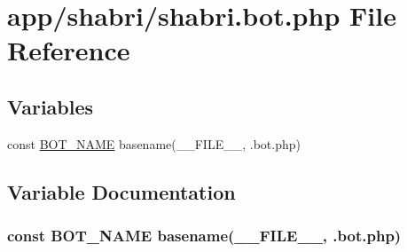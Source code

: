 \hypertarget{shabri_8bot_8php}{}\section{app/shabri/shabri.bot.\+php File Reference}
\label{shabri_8bot_8php}
\subsection*{Variables}
\begin{DoxyCompactItemize}
\item 
const \hyperlink{shabri_8bot_8php_a089257da3946b52574ebf3170ccfd78e}{B\+O\+T\+\_\+\+N\+A\+ME} basename(\+\_\+\+\_\+\+F\+I\+L\+E\+\_\+\+\_\+, \textquotesingle{}.bot.\+php\textquotesingle{})
\end{DoxyCompactItemize}


\subsection{Variable Documentation}
\subsubsection[{\texorpdfstring{B\+O\+T\+\_\+\+N\+A\+ME}{BOT_NAME}}]{\setlength{\rightskip}{0pt plus 5cm}const B\+O\+T\+\_\+\+N\+A\+ME basename(\+\_\+\+\_\+\+F\+I\+L\+E\+\_\+\+\_\+, \textquotesingle{}.bot.\+php\textquotesingle{})}\hypertarget{shabri_8bot_8php_a089257da3946b52574ebf3170ccfd78e}{}\label{shabri_8bot_8php_a089257da3946b52574ebf3170ccfd78e}
